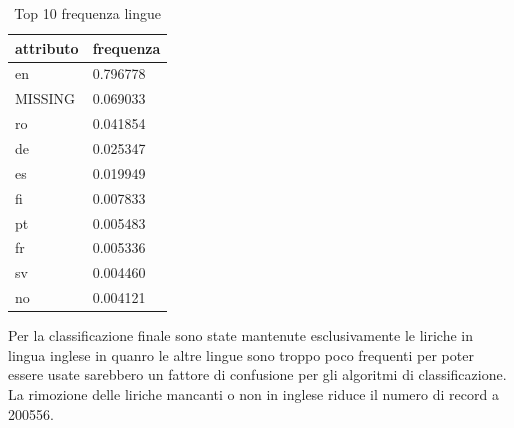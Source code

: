 \documentclass[technote]{IEEEtran}
\begin{document}
\begin{table}[H]
\centering
\caption{Top 10 frequenza lingue}
\begin{tabular}{|l|l|}
\hline
\textbf{attributo} & \textbf{frequenza} \\ \hline
en                 & 0.796778           \\ \hline
MISSING            & 0.069033           \\ \hline
ro                 & 0.041854           \\ \hline
de                 & 0.025347           \\ \hline
es                 & 0.019949           \\ \hline
fi                 & 0.007833           \\ \hline
pt                 & 0.005483           \\ \hline
fr                 & 0.005336           \\ \hline
sv                 & 0.004460           \\ \hline
no                 & 0.004121           \\ \hline
\end{tabular}
\label{t_lang}
\end{table}
Per la classificazione finale sono state mantenute esclusivamente le
liriche in lingua inglese in quanro le altre lingue sono troppo poco frequenti
per poter essere usate sarebbero un fattore di confusione
per gli algoritmi di classificazione. La rimozione delle liriche mancanti
o non in inglese riduce il numero di record a 200556.
\end{document}
